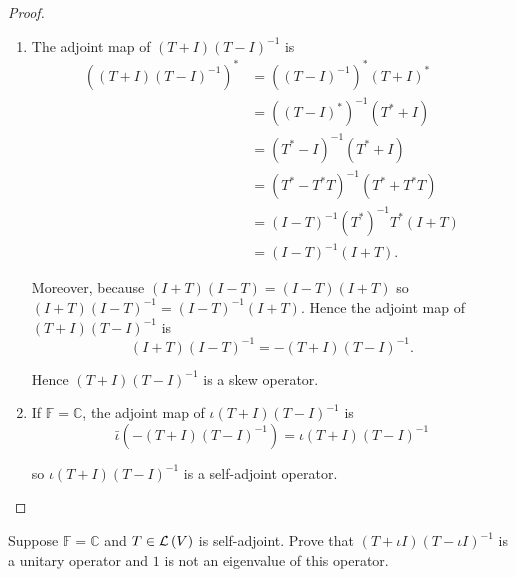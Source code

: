 \begin{proof}
    \begin{enumerate}[label={(\alph*)}]
        \item The adjoint map of $(T + I){(T - I)}^{-1}$ is
              \begin{align*}
                  {\left((T + I){(T - I)}^{-1}\right)}^{*} & = {\left({(T - I)}^{-1}\right)}^{*}{(T + I)}^{*} \\
                                                           & = {\left({(T - I)}^{*}\right)}^{-1}(T^{*} + I)   \\
                                                           & = {(T^{*} - I)}^{-1}(T^{*} + I)                  \\
                                                           & = {(T^{*} - T^{*}T)}^{-1}(T^{*} + T^{*}T)        \\
                                                           & = {(I - T)}^{-1}{(T^{*})}^{-1}T^{*}(I + T)       \\
                                                           & = {(I - T)}^{-1}(I + T).
              \end{align*}

              Moreover, because $(I + T)(I - T) = (I - T)(I + T)$ so ${(I + T)}{(I - T)}^{-1} = {(I - T)}^{-1}(I + T)$. Hence the adjoint map of $(T + I){(T - I)}^{-1}$ is
              \[
                  (I + T){(I - T)}^{-1} = -(T + I){(T - I)}^{-1}.
              \]

              Hence ${(T + I)}{(T - I)}^{-1}$ is a skew operator.
        \item If $\mathbb{F} = \mathbb{C}$, the adjoint map of $\iota (T + I){(T - I)}^{-1}$ is
              \[
                  \bar{\iota}\left(-(T + I){(T - I)}^{-1}\right) = \iota (T + I){(T - I)}^{-1}
              \]

              so $\iota (T + I){(T - I)}^{-1}$ is a self-adjoint operator.
    \end{enumerate}
\end{proof}
\newpage

\begin{exercise}
    Suppose $\mathbb{F} = \mathbb{C}$ and $T \in \mathcal{L}\left({V}\right)$ is self-adjoint. Prove that $(T + \iota I){(T - \iota I)}^{-1}$ is a unitary operator and $1$ is not an eigenvalue of this operator.
\end{exercise}

